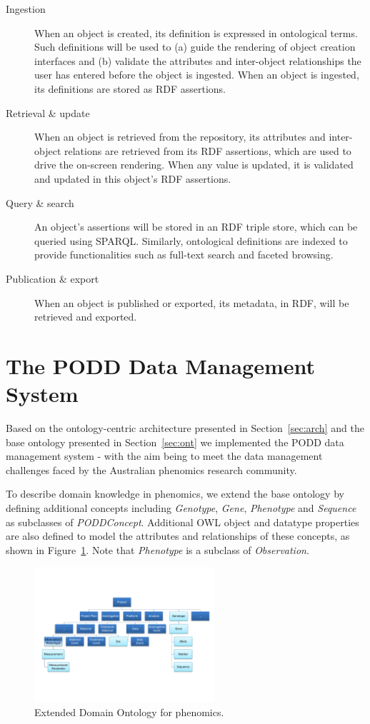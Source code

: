 \documentclass{llncs}
\begin{document}
\begin{description}
\item[Ingestion]
When an object is created, its definition is expressed in
ontological terms. Such definitions will be used to (a) guide the
rendering of object creation interfaces and (b) validate the attributes
and inter-object relationships the user has entered before the object
is ingested. When an object is ingested, its definitions are stored as
RDF assertions.

\item[Retrieval \& update] When an object is retrieved from the
repository, its attributes and inter-object relations are retrieved
from its RDF assertions, which are used to drive the on-screen
rendering. When any value is updated, it is validated and updated in
this object's RDF assertions.

\item[Query \& search] An object's assertions will be stored in an RDF
triple store, which can be queried using SPARQL. Similarly, ontological
definitions are indexed to provide functionalities such as full-text
search and faceted browsing.

\item[Publication \& export] When an object is published or exported, its
metadata, in RDF, will be retrieved and exported.
\end{description}

\section{The PODD Data Management System}\label{sec:podd}
Based on the ontology-centric architecture presented in
Section~\ref{sec:arch} and the base ontology presented in
Section~\ref{sec:ont} we implemented the PODD data management system -
with the aim being to meet the data management challenges faced by the
Australian phenomics research community.

To describe domain knowledge in phenomics, we extend the base ontology
by defining additional concepts including \emph{Genotype}, \emph{Gene},
\emph{Phenotype} and \emph{Sequence} as subclasses of
\emph{PODDConcept}. Additional OWL object and datatype properties are
also defined to model the attributes and relationships of these
concepts, as shown in Figure~\ref{fig:podd_high}. Note that
\emph{Phenotype} is a subclass of \emph{Observation}.

\begin{figure}[htb]
\centering
\includegraphics[trim = 5mm 30mm 5mm 46mm, clip,height=50mm]{ont_podd.pdf}
\vspace{-16pt} \caption{Extended Domain Ontology for
phenomics.}\label{fig:podd_high}
\end{figure}
\end{document}
